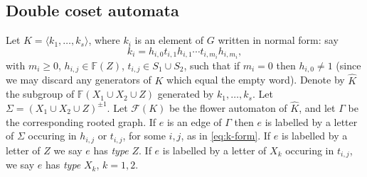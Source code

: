 \documentclass[a4paper,12pt]{article}
\newcommand{\G}{\Gamma }
\renewcommand{\S}{\Sigma }
\newcommand{\cF}{{\cal{F}}}
\numberwithin{equation}{section}
\numberwithin{figure}{section}
\newcommand{\FF}{\ensuremath{\mathbb{F}}}
\renewcommand{\cF}{\mathcal{F}}
\newcommand{\la}{\langle}
\newcommand{\ra}{\rangle}
\begin{document}

\subsection{Double coset automata}\label{sec:dca}
%
%
Let $K=\la k_1, \ldots , k_s\ra$, where $k_i$ is an element of $G$
written in normal form: say
\begin{equation}\label{eq:k-form}
k_i= h_{i,0}t_{i,1}h_{i,1}\cdots t_{i,m_i}h_{i,m_i},
\end{equation}
with $m_i\ge 0$, $h_{i,j}\in \FF(Z)$, $t_{i,j}\in S_1\cup S_2$, such that
if $m_i=0$ then
$h_{i,0}\neq 1$ (since we may discard any generators of $K$ which equal
the empty word). Denote
by $\hat K$ the subgroup of  $\FF(X_1\cup X_2 \cup Z)$ generated by
$k_1, \ldots , k_s$. Let $\S=(X_1\cup X_2 \cup Z)^{\pm 1}$.
Let $\cF(K)$ be the flower automaton of $\hat K$, and let
$\G$ be the corresponding rooted graph. If $e$ is an edge of $\G$ then
$e$ is labelled by a letter of $\S$
occuring in $h_{i,j}$ or $t_{i,j}$, for some $i,j$, as in
\eqref{eq:k-form}. If $e$ is labelled by a letter of $Z$ we say $e$ has {\em type} $Z$.
If $e$ is labelled by a letter of $X_k$ occuring in $t_{i,j}$, we
say $e$ has {\em type} $X_k$, $k = 1,2$.
\end{document}
